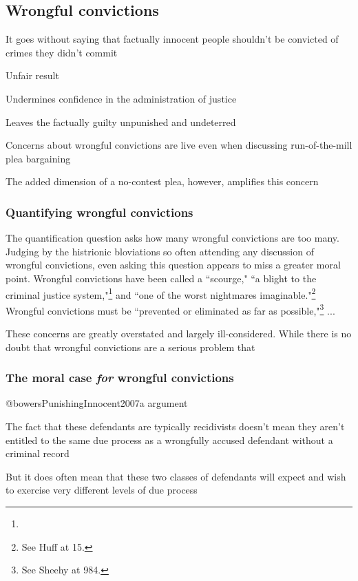 \subsection{Wrongful convictions}

It goes without saying that factually innocent people shouldn't be convicted of crimes they didn't commit

Unfair result

Undermines confidence in the administration of justice

Leaves the factually guilty unpunished and undeterred

Concerns about wrongful convictions are live even when discussing run-of-the-mill plea bargaining

The added dimension of a no-contest plea, however, amplifies this concern

\subsubsection{Quantifying wrongful convictions}

The quantification question asks how many wrongful convictions are too many. Judging by the histrionic bloviations so often attending any discussion of wrongful convictions, even asking this question appears to miss a greater moral point. Wrongful convictions have been called a ``scourge," ``a blight to the criminal justice system,"\footnote{} and ``one of the worst nightmares imaginable."\footnote{See Huff at 15.} Wrongful convictions must be ``prevented or eliminated as far as possible,"\footnote{See Sheehy at 984.} ... 

These concerns are greatly overstated and largely ill-considered. While there is no doubt that wrongful convictions are a serious problem that 

\subsubsection{The moral case \textit{for} wrongful convictions}

@bowersPunishingInnocent2007a argument

The fact that these defendants are typically recidivists doesn't mean they aren't entitled to the same due process as a wrongfully accused defendant without a criminal record

But it does often mean that these two classes of defendants will expect and wish to exercise very different levels of due process

